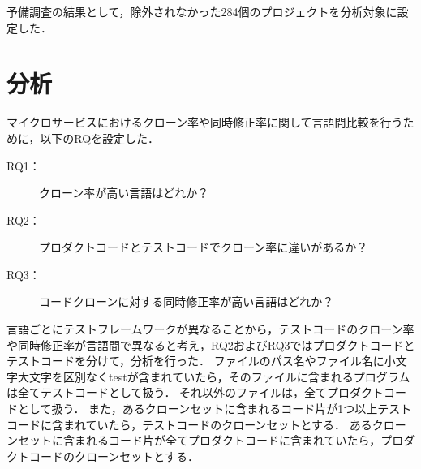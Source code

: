 \documentclass[T,J]{fose}
\begin{document}
予備調査の結果として，除外されなかった284個のプロジェクトを分析対象に設定した．


\section{分析} \label{sec:analysis}
マイクロサービスにおけるクローン率や同時修正率に関して言語間比較を行うために，以下のRQを設定した．
\begin{description}
    \item[RQ1：] クローン率が高い言語はどれか？
    \item[RQ2：] プロダクトコードとテストコードでクローン率に違いがあるか？
    \item[RQ3：] コードクローンに対する同時修正率が高い言語はどれか？
\end{description}
言語ごとにテストフレームワークが異なることから，テストコードのクローン率や同時修正率が言語間で異なると考え，RQ2およびRQ3ではプロダクトコードとテストコードを分けて，分析を行った．
ファイルのパス名やファイル名に小文字大文字を区別なく{\sf test}が含まれていたら，そのファイルに含まれるプログラムは全てテストコードとして扱う．
それ以外のファイルは，全てプロダクトコードとして扱う．
また，あるクローンセットに含まれるコード片が1つ以上テストコードに含まれていたら，テストコードのクローンセットとする．
あるクローンセットに含まれるコード片が全てプロダクトコードに含まれていたら，プロダクトコードのクローンセットとする．

\end{document}
